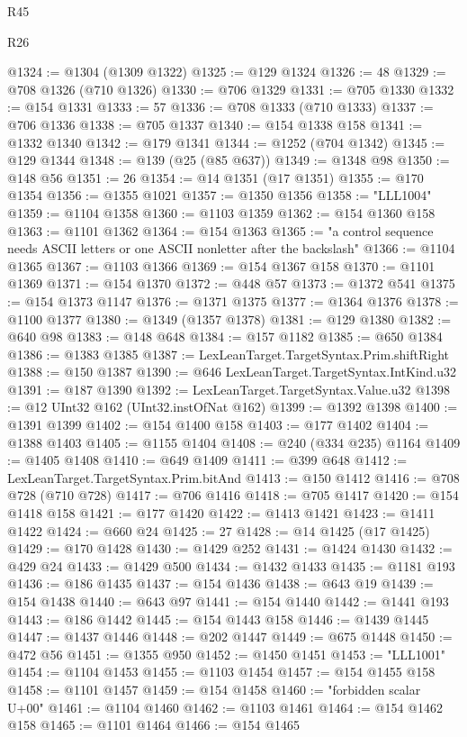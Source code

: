 \begin{lexlean}{R45}
\begin{lexlean}{R26}
\begin{coremodule}
{{{{{{{{{{{{{{{{{{{{{{{{{{{{{{{{{{{{{{{{{{{{{{{{{{{{{{{{{{{{{{{{{{{{{{{{@1324 := @1304 (@1309 @1322)
@1325 := @129 @1324
@1326 := 48
@1329 := @708 @1326 (@710 @1326)
@1330 := @706 @1329
@1331 := @705 @1330
@1332 := @154 @1331
@1333 := 57
@1336 := @708 @1333 (@710 @1333)
@1337 := @706 @1336
@1338 := @705 @1337
@1340 := @154 @1338 @158
@1341 := @1332 @1340
@1342 := @179 @1341
@1344 := @1252 (@704 @1342)
@1345 := @129 @1344
@1348 := @139 (@25 (@85 @637))
@1349 := @1348 @98
@1350 := @148 @56
@1351 := 26
@1354 := @14 @1351 (@17 @1351)
@1355 := @170 @1354
@1356 := @1355 @1021
@1357 := @1350 @1356
@1358 := "LLL1004"
@1359 := @1104 @1358
@1360 := @1103 @1359
@1362 := @154 @1360 @158
@1363 := @1101 @1362
@1364 := @154 @1363
@1365 := "a control sequence needs ASCII letters or one ASCII nonletter after the backslash"
@1366 := @1104 @1365
@1367 := @1103 @1366
@1369 := @154 @1367 @158
@1370 := @1101 @1369
@1371 := @154 @1370
@1372 := @448 @57
@1373 := @1372 @541
@1375 := @154 @1373 @1147
@1376 := @1371 @1375
@1377 := @1364 @1376
@1378 := @1100 @1377
@1380 := @1349 (@1357 @1378)
@1381 := @129 @1380
@1382 := @640 @98
@1383 := @148 @648
@1384 := @157 @1182
@1385 := @650 @1384
@1386 := @1383 @1385
@1387 := LexLeanTarget.TargetSyntax.Prim.shiftRight
@1388 := @150 @1387
@1390 := @646 LexLeanTarget.TargetSyntax.IntKind.u32
@1391 := @187 @1390
@1392 := LexLeanTarget.TargetSyntax.Value.u32
@1398 := @12 UInt32 @162 (UInt32.instOfNat @162)
@1399 := @1392 @1398
@1400 := @1391 @1399
@1402 := @154 @1400 @158
@1403 := @177 @1402
@1404 := @1388 @1403
@1405 := @1155 @1404
@1408 := @240 (@334 @235) @1164
@1409 := @1405 @1408
@1410 := @649 @1409
@1411 := @399 @648
@1412 := LexLeanTarget.TargetSyntax.Prim.bitAnd
@1413 := @150 @1412
@1416 := @708 @728 (@710 @728)
@1417 := @706 @1416
@1418 := @705 @1417
@1420 := @154 @1418 @158
@1421 := @177 @1420
@1422 := @1413 @1421
@1423 := @1411 @1422
@1424 := @660 @24
@1425 := 27
@1428 := @14 @1425 (@17 @1425)
@1429 := @170 @1428
@1430 := @1429 @252
@1431 := @1424 @1430
@1432 := @429 @24
@1433 := @1429 @500
@1434 := @1432 @1433
@1435 := @1181 @193
@1436 := @186 @1435
@1437 := @154 @1436
@1438 := @643 @19
@1439 := @154 @1438
@1440 := @643 @97
@1441 := @154 @1440
@1442 := @1441 @193
@1443 := @186 @1442
@1445 := @154 @1443 @158
@1446 := @1439 @1445
@1447 := @1437 @1446
@1448 := @202 @1447
@1449 := @675 @1448
@1450 := @472 @56
@1451 := @1355 @950
@1452 := @1450 @1451
@1453 := "LLL1001"
@1454 := @1104 @1453
@1455 := @1103 @1454
@1457 := @154 @1455 @158
@1458 := @1101 @1457
@1459 := @154 @1458
@1460 := "forbidden scalar U+00"
@1461 := @1104 @1460
@1462 := @1103 @1461
@1464 := @154 @1462 @158
@1465 := @1101 @1464
@1466 := @154 @1465
}}}}}}}}}}}}}}}}}}}}}}}}}}}}}}}}}}}}}}}}}}}}}}}}}}}}}}}}}}}}}}}}}}}}}}}}
\end{coremodule}
\end{lexlean}
\end{lexlean}
